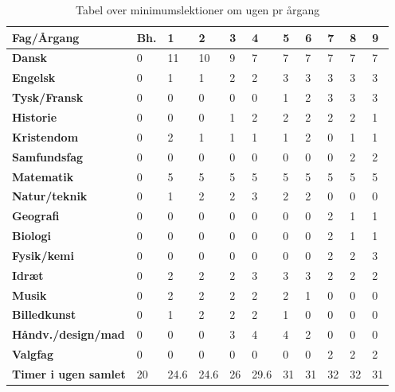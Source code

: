 \begin{table}[h!]
\centering
\begin{tabular}{|l|l|l|l|l|l|l|l|l|l|l|}
\hline
\textbf{Fag/Årgang}                 & \textbf{Bh.} & \textbf{1} & \textbf{2} & \textbf{3} & \textbf{4} & \textbf{5} & \textbf{6} & \textbf{7} & \textbf{8} & \textbf{9} \\ \hline
\textbf{Dansk}                      & 0   & 11   & 10   & 9    & 7    & 7    & 7    & 7    & 7    & 7    \\ \hline
\textbf{Engelsk}                    & 0   & 1    & 1    & 2    & 2    & 3    & 3    & 3    & 3    & 3    \\ \hline
\textbf{Tysk/Fransk}                & 0   & 0    & 0    & 0    & 0    & 1    & 2    & 3    & 3    & 3    \\ \hline
\textbf{Historie}                   & 0   & 0    & 0    & 1    & 2    & 2    & 2    & 2    & 2    & 1    \\ \hline
\textbf{Kristendom}                 & 0   & 2    & 1    & 1    & 1    & 1    & 2    & 0    & 1    & 1    \\ \hline
\textbf{Samfundsfag}                & 0   & 0    & 0    & 0    & 0    & 0    & 0    & 0    & 2    & 2    \\ \hline
\textbf{Matematik}                  & 0   & 5    & 5    & 5    & 5    & 5    & 5    & 5    & 5    & 5    \\ \hline
\textbf{Natur/teknik}               & 0   & 1    & 2    & 2    & 3    & 2    & 2    & 0    & 0    & 0    \\ \hline
\textbf{Geografi}                   & 0   & 0    & 0    & 0    & 0    & 0    & 0    & 2    & 1    & 1    \\ \hline
\textbf{Biologi}                    & 0   & 0    & 0    & 0    & 0    & 0    & 0    & 2    & 1    & 1    \\ \hline
\textbf{Fysik/kemi}                 & 0   & 0    & 0    & 0    & 0    & 0    & 0    & 2    & 2    & 3    \\ \hline
\textbf{Idræt}                      & 0   & 2    & 2    & 2    & 3    & 3    & 3    & 2    & 2    & 2    \\ \hline
\textbf{Musik}                      & 0   & 2    & 2    & 2    & 2    & 2    & 1    & 0    & 0    & 0    \\ \hline
\textbf{Billedkunst}                & 0   & 1    & 2    & 2    & 2    & 1    & 0    & 0    & 0    & 0    \\ \hline
\textbf{Håndv./design/mad} & 0   & 0    & 0    & 3    & 4    & 4    & 2    & 0    & 0    & 0    \\ \hline
\textbf{Valgfag}                    & 0   & 0    & 0    & 0    & 0    & 0    & 0    & 2    & 2    & 2    \\ \hline
\textbf{Timer i ugen samlet}        & 20  & 24.6 & 24.6 & 26   & 29.6 & 31   & 31   & 32   & 32   & 31   \\ \hline
\end{tabular}
\caption{Tabel over minimumslektioner om ugen pr årgang}
\label{tab:lektioner_pr_uge}
\end{table}


